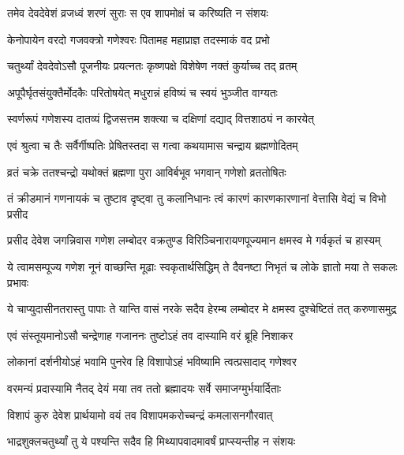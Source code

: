 \begin{center}
\twolineshloka
{तमेव देवदेवेशं व्रजध्वं शरणं सुराः}
{स एव शापमोक्षं च करिष्यति न संशयः}%


\twolineshloka
{केनोपायेन वरदो गजवक्त्रो गणेश्वरः}
{पितामह महाप्राज्ञ तदस्माकं वद प्रभो}%


\twolineshloka
{चतुर्थ्यां देवदेवोऽसौ पूजनीयः प्रयत्नतः}
{कृष्णपक्षे विशेषेण नक्तं कुर्याच्च तद् व्रतम्}%

\twolineshloka
{अपूपैर्घृतसंयुक्तैर्मोदकैः परितोषयेत्}
{मधुरान्नं हविष्यं च स्वयं भुञ्जीत वाग्यतः}%

\twolineshloka
{स्वर्णरूपं गणेशस्य दातव्यं द्विजसत्तम}
{शक्त्या च दक्षिणां दद्याद् वित्तशाठ्यं न कारयेत्}%

\twolineshloka
{एवं श्रुत्वा च तैः सर्वैर्गीष्पतिः प्रेषितस्तदा}
{स गत्वा कथयामास चन्द्राय ब्रह्मणोदितम्}%

\twolineshloka
{व्रतं चक्रे ततश्चन्द्रो यथोक्तं ब्रह्मणा पुरा}
{आविर्बभूव भगवान् गणेशो व्रततोषितः}%

\fourlineindentedshloka
{तं क्रीडमानं गणनायकं च}
{तुष्टाव दृष्ट्वा तु कलानिधानः}
{त्वं कारणं कारणकारणानां}
{वेत्तासि वेद्यं च विभो प्रसीद}%

\fourlineindentedshloka
{प्रसीद देवेश जगन्निवास}
{गणेश लम्बोदर वक्रतुण्ड}
{विरिञ्चिनारायणपूज्यमान}
{क्षमस्व मे गर्वकृतं च हास्यम्}%

\fourlineindentedshloka
{ये त्वामसम्पूज्य गणेश नूनं}
{वाच्छन्ति मूढाः स्वकृतार्थसिद्धिम्}
{ते दैवनष्टा निभृतं च लोके}
{ज्ञातो मया ते सकलः प्रभावः}%

\fourlineindentedshloka
{ये चाप्युदासीनतरास्तु पापाः}
{ते यान्ति वासं नरके सदैव}
{हेरम्ब लम्बोदर मे क्षमस्व}
{दुश्चेष्टितं तत् करुणासमुद्र}%

\twolineshloka
{एवं संस्तूयमानोऽसौ चन्द्रेणाह गजाननः}
{तुष्टोऽहं तव दास्यामि वरं ब्रूहि निशाकर}%


\twolineshloka
{लोकानां दर्शनीयोऽहं भवामि पुनरेव हि}
{विशापोऽहं भविष्यामि त्वत्प्रसादाद् गणेश्वर}%


\twolineshloka
{वरमन्यं प्रदास्यामि नैतद् देयं मया तव}
{ततो ब्रह्मादयः सर्वे समाजग्मुर्भयार्दिताः}%

\twolineshloka
{विशापं कुरु देवेश प्रार्थयामो वयं तव}
{विशापमकरोच्चन्द्रं कमलासनगौरवात्}%

\twolineshloka
{भाद्रशुक्लचतुर्थ्यां तु ये पश्यन्ति सदैव हि}
{मिथ्यापवादमावर्षं प्राप्स्यन्तीह न संशयः}%


\end{center}
